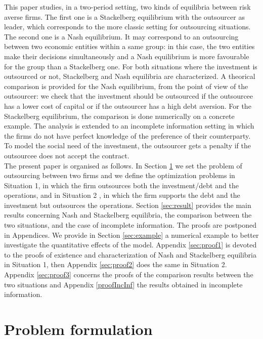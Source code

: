 \documentclass{svjour3}
\begin{document}
This paper studies, in a two-period setting, two kinds of equilibria  between risk averse firms. The first one is a Stackelberg equilibrium with the outsourcer as leader, which corresponds to  the more classic setting for outsourcing situations. The second one is  a Nash equilibrium. It may correspond to an outsourcing between two economic entities within a same group: in this case, the two  entities make their decisions simultaneously and a Nash equilibrium is more favourable for the group than a Stackelberg one. For both situations where the investment is outsourced or not, Stackelberg and Nash equilibria are characterized. A theorical comparison is provided for the Nash equilibrium, from the point of view of the outsourcer: we check  that the investment should be outsourced if the outsourcee has a lower cost of capital or if the outsourcer has a high debt aversion.  For the Stackelberg equilibrium, the comparison is done numerically on a concrete example. The analysis is extended to an incomplete information setting in which the firms do not have perfect knowledge of the preference of their counterparty. To model the social need of the investment, the outsourcer gets a penalty if the outsourcee does not accept the contract.  \\

The present paper is organised as follows. In Section \ref{pb} we set the problem of outsourcing between two firms and we define the optimization problems in Situation 1,  in which the firm outsources both the investment/debt and the operations, and in Situation 2 , in which the firm supports the debt and the investment but outsources the operations.
Section \ref{sec:result} provides the main results concerning Nash and Stackelberg equilibria, the comparison between the two situations, and the case of incomplete information. The proofs are postponed in Appendices.
 We provide in Section \ref{sec:example}  a numerical example to better investigate the quantitative effects of the model. 
Appendix \ref{sec:proof1} is devoted to the proofs  of existence and characterization of Nash and Stackelberg equilibria in  Situation 1, then Appendix \ref{sec:proof2} does the same  in Situation 2. Appendix \ref{sec:proof3} concerns the proofs of the 
comparison results between the two situations and Appendix \ref{proofIncInf} the results obtained in incomplete information.

\section{Problem formulation}
\label{pb}
\end{document}
